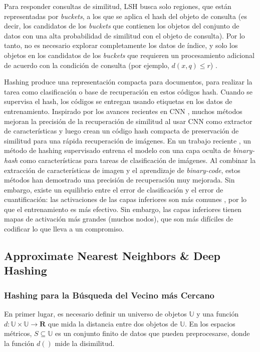 Para responder consultas de similitud, \ac{LSH} busca solo regiones, que están representadas por \textit{buckets}, a los que se aplica el hash del objeto de consulta (es decir, los candidatos de los \textit{buckets}  que contienen los objetos del conjunto de datos con una alta probabilidad de similitud con el objeto de consulta). Por lo tanto, no es necesario explorar completamente los datos de índice, y solo los objetos en los candidatos de los \textit{buckets}  que requieren un procesamiento adicional de acuerdo con la condición de consulta (por ejemplo, $ d(x,q) \leq r $) \cite{DBLP:journals/jidm/OcsaS10}.

Hashing produce una representación compacta para documentos, para realizar la tarea como clasificación o base de recuperación en estos códigos hash. Cuando se supervisa el hash, los códigos se entregan usando etiquetas en los datos de entrenamiento. Inspirado por los avances recientes en \acf{CNN} \cite{ImageNet}, muchos métodos mejoran la precisión de la recuperación de similitud al usar CNN como extractor de características y luego crean un código hash compacta de preservación de similitud para una rápida recuperación de imágenes. En un trabajo reciente \cite{kLin:DH}, un método de hashing supervisado entrena el modelo con una capa oculta de \textit{binary-hash} como características para tareas de clasificación de imágenes. Al combinar la extracción de características de imagen y el aprendizaje de \textit{binary-code}, estos métodos han demostrado una precisión de recuperación muy mejorada. Sin embargo, existe un equilibrio entre el error de clasificación y el error de cuantificación: las activaciones de las capas inferiores son más comunes \cite{DBLP:journals/corr/YosinskiCBL14}, por lo que el entrenamiento es más efectivo. Sin embargo, las capas inferiores tienen mapas de activación más grandes (muchos nodos), que son más difíciles de codificar lo que lleva a un compromiso.


\subsection{Approximate Nearest Neighbors \& Deep Hashing}
\subsubsection{Hashing para la Búsqueda del Vecino más Cercano}
En primer lugar, es necesario definir un universo de objetos $ \mathbb{U} $ y una función $ d:\mathbb{U} \times \mathbb{U} \rightarrow \mathbf{R} $ que mida la distancia entre dos objetos de $ \mathbb{U} $. En los espacios métricos, $ S \subseteq \mathbb{U} $ es un conjunto finito de datos que pueden preprocesarse, donde la función $ d() $ mide la disimilitud.

